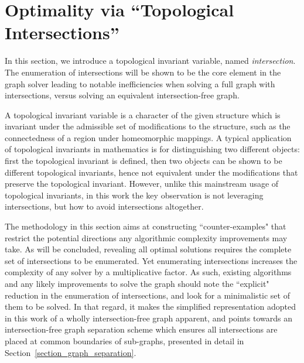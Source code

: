 \documentclass[journal]{IEEEtran}
\begin{document}
\section{Optimality via ``Topological Intersections''}
\label{section_intersection}
In this section, we introduce a topological invariant variable, named \textit{intersection}.  
The enumeration of intersections will be shown to be the core element in the graph solver leading to notable inefficiencies when solving a full graph with intersections, versus solving an equivalent intersection-free graph. 

A topological invariant variable is a character of the given structure which is invariant under the admissible set of modifications to the structure, 
such as the connectedness of a region under homeomorphic mappings. A typical application of topological invariants in mathematics is for distinguishing two different objects: first the topological invariant is defined, then two objects can be shown to be different topological invariants, hence not equivalent 
under the modifications that preserve the topological invariant. 
However, unlike this mainstream usage of topological invariants, in this work the key observation is not leveraging intersections, but how to avoid intersections altogether. 

The methodology in this section aims at constructing ``counter-examples" that restrict the potential directions any algorithmic complexity 
improvements may take. As will be concluded, revealing all optimal solutions requires the complete set of intersections to be enumerated. Yet enumerating intersections increases the complexity of any solver by a multiplicative factor. 
As such, existing algorithms and any likely improvements to solve the graph should note the ``explicit" reduction in the enumeration of intersections, and look for a minimalistic set of them to be solved.
In that regard, it makes the simplified representation adopted in this work of a wholly intersection-free graph apparent, and points towards an intersection-free graph separation scheme which ensures all intersections are placed at common boundaries of sub-graphs, presented in detail in Section~\ref{section_graph_separation}. 
\end{document}
